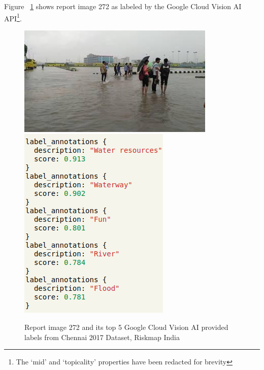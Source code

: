 Figure \figureautorefname{}~\ref{fig:goog_272} shows report image 272 as labeled
by the Google Cloud Vision AI API\footnote{The `mid' and `topicality' properties
have been redacted for brevity}.
\begin{figure}[ht]
    \centering
    \captionsetup{justification=centering}
    \includegraphics[scale=0.6]{images/ch/272.jpeg}
    \includegraphics[scale=0.6]{images/ch/goog_272.png}
    \caption{Report image 272 and its top 5 Google Cloud Vision AI provided
    labels from Chennai 2017 Dataset, Riskmap India}\label{fig:goog_272}
\end{figure}

